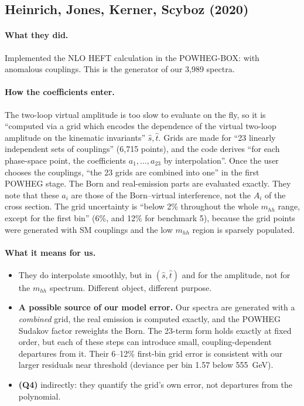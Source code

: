 \subsection{Heinrich, Jones, Kerner, Scyboz (2020) \cite{Heinrich2020}}

\paragraph{What they did.} Implemented the NLO HEFT calculation in the POWHEG-BOX:
 with anomalous couplings. This is the generator of our 3,989 spectra.

\paragraph{How the coefficients enter.} The two-loop virtual amplitude is too slow to
evaluate on the fly, so it is ``computed via a grid which encodes the dependence of the
virtual two-loop amplitude on the kinematic invariants'' $\hat s,\hat t$. Grids are made for
``23 linearly independent sets of couplings'' (6,715 points), and the code derives ``for each
phase-space point, the coefficients $a_1,\dots,a_{23}$ by interpolation''. Once the user
chooses the couplings, ``the 23 grids are combined into one'' in the first POWHEG stage. The
Born and real-emission parts are evaluated exactly. They note that these $a_i$ are those of
the Born--virtual interference, not the $A_i$ of the cross section. The grid uncertainty
is ``below 2\% throughout the whole $m_{hh}$ range, except for the first bin'' (6\%, and
12\% for benchmark 5), because the grid points were generated with SM couplings and the low
$m_{hh}$ region is sparsely populated.

\paragraph{What it means for us.}
\begin{itemize}
  \item They do interpolate smoothly, but in $(\hat s,\hat t)$ and for the amplitude, not for
    the $m_{hh}$ spectrum. Different object, different purpose.
  \item \textbf{A possible source of our model error.} Our spectra are generated with a
    \emph{combined} grid, the real emission is computed exactly, and the POWHEG Sudakov
    factor reweights the Born. The 23-term form holds exactly at fixed order, but each of
    these steps can introduce small, coupling-dependent departures from it. Their 6--12\%
    first-bin grid error is consistent with our larger residuals near threshold (deviance per
    bin 1.57 below 555~GeV).
  \item \textbf{(Q4)} indirectly: they quantify the grid's own error, not departures from the
    polynomial.
\end{itemize}


